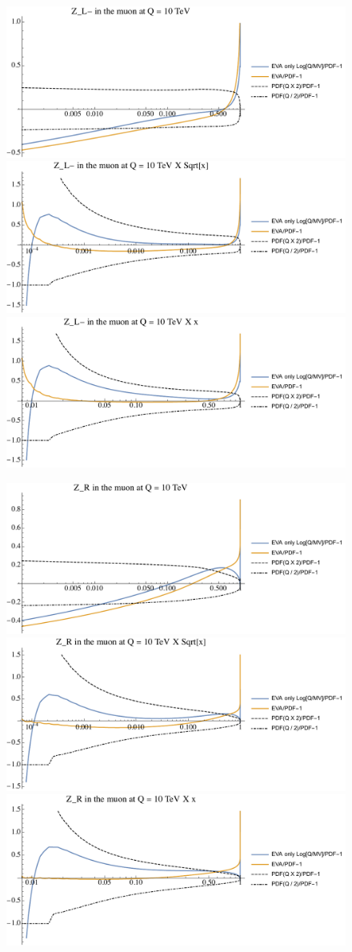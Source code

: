 \documentclass[a4paper,11pt]{article}
\begin{document}
\begin{figure}[ht]
\includegraphics[width=0.4\linewidth]{PlotPDFs/ratios/10TeV/Z_L-_Q.pdf}
\includegraphics[width=0.4\linewidth]{PlotPDFs/ratios/10TeV/Z_L-_Qsqrtx.pdf}
\includegraphics[width=0.4\linewidth]{PlotPDFs/ratios/10TeV/Z_L-_Qx.pdf}
\end{figure}

\begin{figure}[ht]
\includegraphics[width=0.4\linewidth]{PlotPDFs/ratios/10TeV/Z_R_Q.pdf}
\includegraphics[width=0.4\linewidth]{PlotPDFs/ratios/10TeV/Z_R_Qsqrtx.pdf}
\includegraphics[width=0.4\linewidth]{PlotPDFs/ratios/10TeV/Z_R_Qx.pdf}
\end{figure}
\end{document}
